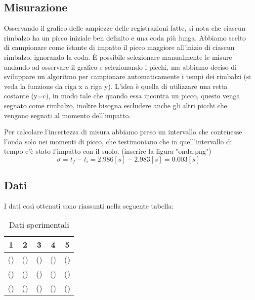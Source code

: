 \documentclass[a4paper]{article}
\begin{document}
    \subsection{Misurazione}
    Osservando il grafico delle ampiezze delle registrazioni fatte, si nota che ciascun rimbalzo
    ha un picco iniziale ben definito e una coda più lunga. 
    Abbiamo scelto di campionare come istante di impatto il picco maggiore all'inizio di ciascun rimbalzo,
    ignorando la coda. È possibile selezionare manualmente le misure andando ad osservare il grafico e selezionando i picchi, ma abbiamo deciso di sviluppare un algoritmo per campionare automaticamente i tempi dei rimbalzi (si veda la funzione da riga x a riga y). L'idea è quella di utilizzare una retta costante (y=c), in modo tale che quando essa incontra un picco, questo venga segnato come rimbalzo, inoltre bisogna escludere anche gli altri picchi che vengono segnati al momento dell'impatto.
    
    Per calcolare l'incertezza di misura abbiamo preso un intervallo che contenesse l'onda solo nei momenti di picco, che testimoniano che in quell'intervallo di tempo c'è stato l'impatto con il suolo.
    (inserire la figura "onda.png")
    \begin{equation}
        \sigma = t_f - t_i = 2.986[s] - 2.983 [s] = 0.003 [s]
    \end{equation}
    
    \subsection{Dati}
    I dati così ottenuti sono riassunti nella seguente tabella:\\
    \begin{table}[h!]
        \centering
        \begin{tabular}{|c|c|c|c|c|}
             \hline
             1 & 2 & 3 & 4 & 5 \\ [0.5ex]
             \hline\hline
             () & () & () & () & () \\
             () & () & () & () & () \\
             () & () & () & () & () \\ [1ex]
             \hline
        \end{tabular}
        \caption{Dati sperimentali}
        \label{tab:dati}
    \end{table}
    
\end{document}
